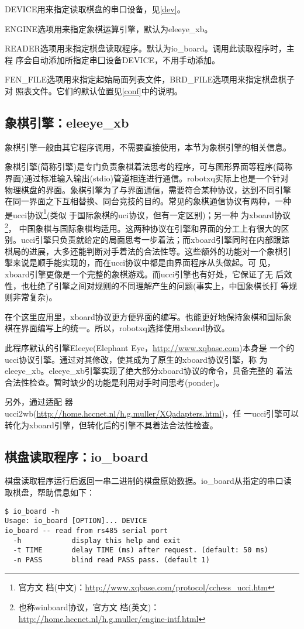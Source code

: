 \documentclass[a4paper]{article}
\begin{document}
DEVICE用来指定读取棋盘的串口设备，见\ref{dev}。

ENGINE选项用来指定象棋运算引擎，默认为eleeye\_xb。

READER选项用来指定棋盘读取程序。默认为io\_board。调用此读取程序时，主程
序会自动添加所指定串囗设备DEVICE，不用手动添加。

FEN\_FILE选项用来指定起始局面列表文件，BRD\_FILE选项用来指定棋盘棋子对
照表文件。它们的默认位置见\ref{conf}中的说明。


\subsection{象棋引擎：eleeye\_xb}
象棋引擎一般由其它程序调用，不需要直接使用，本节为象棋引擎的相关信息。

象棋引擎(简称引擎)是专门负责象棋着法思考的程序，可与图形界面等程序(简称
界面)通过标准输入输出(stdio)管道相连进行通信。robotxq实际上也是一个针对
物理棋盘的界面。象棋引擎为了与界面通信，需要符合某种协议，达到不同引擎
在同一界面之下互相替换、同台竞技的目的。常见的象棋通信协议有两种，一种
是ucci协议\footnote{官方文
  档(中文)：\url{http://www.xqbase.com/protocol/cchess_ucci.htm}}(类似
于国际象棋的uci协议，但有一定区别)；另一种
为xboard协议\footnote{也称winboard协议，官方文
  档(英文)：\url{http://home.hccnet.nl/h.g.muller/engine-intf.html}}，
中国象棋与国际象棋均适用。这两种协议在引擎和界面的分工上有很大的区
别。ucci引擎只负责就给定的局面思考一步着法；而xboard引擎同时在内部跟踪
棋局的进展，大多还能判断对手着法的合法性等。这些额外的功能对一个象棋引
掣来说是顺手能实现的，而在ucci协议中都是由界面程序从头做起。可
见，xboard引擎更像是一个完整的象棋游戏。而ucci引擎也有好处，它保证了无
后效性，也杜绝了引擎之间对规则的不同理解产生的问题(事实上，中国象棋长打
等规则非常复杂)。

在个这里应用里，xboard协议更方便界面的编写。也能更好地保持象棋和国际象
棋在界面编写上的统一。所以，robotxq选择使用xboard协议。

此程序默认的引擎Eleeye(Elephant Eye，\url{http://www.xqbase.com})本身是
一个的ucci协议引擎。通过对其修改，使其成为了原生的xboard协议引擎，称
为eleeye\_xb。eleeye\_xb引擎实现了绝大部分xboard协议的命令，具备完整的
着法合法性检查。暂时缺少的功能是利用对手时间思考(ponder)。

另外，通过适配
器ucci2wb(\url{http://home.hccnet.nl/h.g.muller/XQadapters.html})，任
一ucci引擎可以转化为xboard引擎，但转化后的引擎不具着法合法性检查。

\subsection{棋盘读取程序：io\_board}
棋盘读取程序运行后返回一串二进制的棋盘原始数据。io\_board从指定的串口读
取棋盘，帮助信息如下：
\begin{verbatim}
$ io_board -h
Usage: io_board [OPTION]... DEVICE
io_board -- read from rs485 serial port
  -h            display this help and exit
  -t TIME       delay TIME (ms) after request. (default: 50 ms)
  -n PASS       blind read PASS pass. (default 1)
\end{verbatim}
\end{document}

